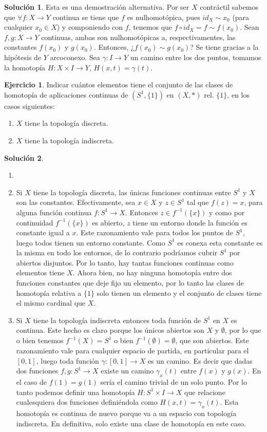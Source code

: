 \documentclass{article}
\theoremstyle{plain}
\theoremstyle{definition}
\newtheorem{exercise}{Ejercicio}
\newtheorem*{sol*}{Solución}
\begin{document}
\begin{sol*}
Esta es una demostración alternativa. Por ser $X$ contráctil sabemos que $\forall f:X\to Y$ continua se tiene que $f$ es nulhomotópica, pues $id_X \sim x_0$ (para cualquier $x_0\in X$) y componiendo con $f$, tenemos que $f \circ id_X = f \sim f(x_0)$. Sean $f,g:X\to Y$ continuas, ambas son nulhomotópicas a, respectivamentes, las constantes $f(x_0)$ y $g(x_0)$. Entonces, ¿$f(x_0)\sim g(x_0)$? Se tiene gracias a la hipótesis de $Y$ arcoconexo. Sea $\gamma:I\to Y$ un camino entre los dos puntos, tomamos la homotopía $H:X\times I \to Y$, $H(x,t)=\gamma(t)$.
\end{sol*}
\newpage
\begin{exercise}
Indicar cuántos elementos tiene el conjunto de las clases de homotopía de aplicaciones continuas de $(S^1,\{1\})$ en $(X,*)$ rel. $\{1\}$, en los casos siguientes:
\begin{enumerate}
\item $X$ tiene la topología discreta.
\item $X$ tiene la topología indiscreta.
\end{enumerate}

\end{exercise}
\begin{sol*}
\begin{enumerate}
\item[]
\item Si $X$ tiene la topología discreta, las únicas funciones continuas entre $S^1$ y $X$ son las constantes. Efectivamente, sea $x\in X$ y $z\in S^1$ tal que $f(z)=x$, para alguna función continua $f:S^1\to X$. Entonces $z\in f^{-1}(\{x\})$ y como por continuidad $f^{-1}(\{x\})$ es abierto, $z$ tiene un entorno donde la función es constante igual a $x$. Este razonamiento vale para todos los puntos de $S^1$, luego todos tienen un entorno constante. Como $S^1$ es conexa esta constante es la misma en todo los entornos, de lo contrario podríamos cubrir $S^1$ por abiertos disjuntos. Por lo tanto, hay tantas funciones continuas como elementos tiene $X$. Ahora bien, no hay ninguna homotopía entre dos funciones constantes que deje fijo un elemento, por lo tanto las clases de homotopía relativa a $\{1\}$ solo tienen un elemento y el conjunto de clases tiene el mismo cardinal que $X$. 
\item Si $X$ tiene la topología indiscreta entonces toda función de $S^1$ en $X$ es continua. Este hecho es claro porque los únicos abiertos son $X$ y $\emptyset$, por lo que o bien tenemos $f^{-1}(X)=S^1$ o bien $f^{-1}(\emptyset)=\emptyset$, que son abiertos. Este razonamiento vale para cualquier espacio de partida, en particular para el $[0,1]$, luego toda función $\gamma:[0,1]\to X$ es un camino. Es decir que dadas dos funciones $f,g:S^1\to X$ existe un camino $\gamma_x(t)$ entre $f(x)$ y $g(x)$. En el caso de $f(1)=g(1)$ sería el camino trivial de un solo punto. Por lo tanto podemos definir una homotopía $H:S^1\times I\to X$ que relacione cualesquiera dos funciones definiéndola como $H(x,t)=\gamma_x(t)$. Esta homotopía es continua de nuevo porque va a un espacio con topología indiscreta. En definitiva, solo existe una clase de homotopía en este caso.
\end{enumerate}
\end{sol*}
\end{document}
